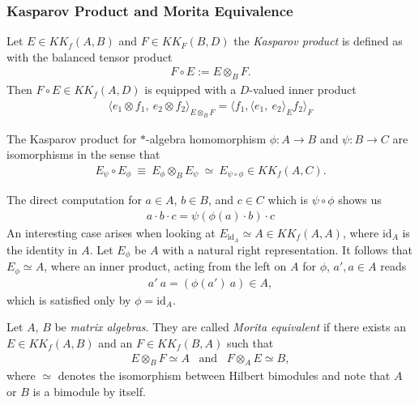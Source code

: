 \subsubsection{Kasparov Product and Morita Equivalence\label{chap: kasparov
product}}
\begin{mydefinition}
    Let $E \in KK_f(A, B)$ and $F \in KK_F(B, D)$ the \textit{Kasparov product} is defined as
    with the balanced tensor product
    \begin{align}
        F \circ E := E \otimes _B F.
    \end{align}
    Then $F\circ E \in KK_f(A,D)$ is equipped with a $D$-valued inner product
    \begin{align}
        \langle e_1 \otimes f_1,\ e_2 \otimes f_2\rangle _{E\otimes _B F} =
        \langle f_1,\langle e_1,\ e_2\rangle _E f_2\rangle _F
    \end{align}
\end{mydefinition}

The Kasparov product for $*$-algebra homomorphism $\phi: A \rightarrow B$ and
$\psi: B \rightarrow C$ are isomorphisms in the sense that
\begin{align}
                E_{\psi} \circ E_{\phi}\ \equiv\ E_{\phi} \otimes _B E_{\psi}\
                \simeq\
                E_{\psi \circ \phi} \in KK_f(A,C).
\end{align}

The direct computation for $a \in A$, $b\in B$, and $c\in C$ which is $\psi
\circ \phi$ shows us
\begin{align}
a \cdot b \cdot c = \psi(\phi (a) \cdot b) \cdot c
\end{align}
An interesting case arises when looking at $E_{\text{id}_A} \simeq A \in
KK_f(A,A)$, where $\text{id}_A$ is the identity in $A$. Let $E_{\phi}$ be $A$
with a natural right representation. It follows that $E_{\phi}\simeq A$, where
an inner product, acting from the left on $A$ for $\phi$, $a', a\in A$ reads
\begin{align}
    a'\ a = (\phi(a')\ a) \in A,
\end{align}
which is satisfied only by $\phi = \text{id}_A$.

\begin{mydefinition}
    Let $A$, $B$ be \textit{matrix algebras}. They are called \textit{Morita equivalent} if there
    exists an $E \in KK_f(A, B)$ and an $F \in KK_f(B, A)$ such that
    \begin{align}
        E \otimes _B F \simeq A \;\;\; \text{and} \;\;\; F \otimes _A E \simeq
        B,
    \end{align}
    where $\simeq$ denotes the isomorphism between Hilbert bimodules and note
    that $A$ or $B$ is a bimodule by itself.
\end{mydefinition}

